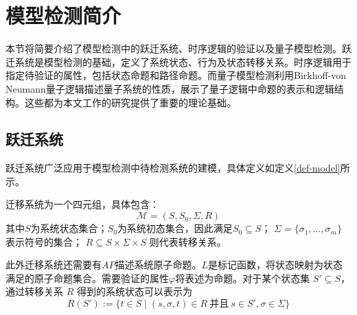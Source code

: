 

\section{模型检测简介}
本节将简要介绍了模型检测中的跃迁系统、时序逻辑的验证以及量子模型检测。跃迁系统是模型检测的基础，定义了系统状态、行为及状态转移关系。时序逻辑用于指定待验证的属性，包括状态命题和路径命题。而量子模型检测利用Birkhoff-von Neumann量子逻辑描述量子系统的性质，展示了量子逻辑中命题的表示和逻辑结构。这些都为本文工作的研究提供了重要的理论基础。
\subsection{跃迁系统}
\label{sec-transition}
跃迁系统广泛应用于模型检测中待检测系统的建模，具体定义如定义\ref{def-model}所示。
\begin{definition}\citep{baier2008principles}
    \label{def-model}
    迁移系统为一个四元组，具体包含：
    \begin{equation}
        \mathcal{M}=(S, S_0, \Sigma, R)
    \end{equation}
    其中\(S\)为系统状态集合；\(S_0\)为系统初态集合，因此满足\(S_0\subseteq S\)； $\Sigma=\{\sigma_1,\ldots,\sigma_m\}$ 表示符号的集合； $R \subseteq S \times \Sigma \times S$ 则代表转移关系。
\end{definition}

此外迁移系统还需要有\(AP\)描述系统原子命题。$L$是标记函数，将状态映射为状态满足的原子命题集合。需要验证的属性\(\varphi\)将表述为命题。对于某个状态集 $S' \subseteq S$，通过转移关系 $R$ 得到的系统状态可以表示为
\begin{equation}\label{eq:image}
R(S') := \{ t\in S \mid (s, \sigma, t) \in R\ \text{并且}\ s \in S', \sigma \in \Sigma\}
\end{equation}


